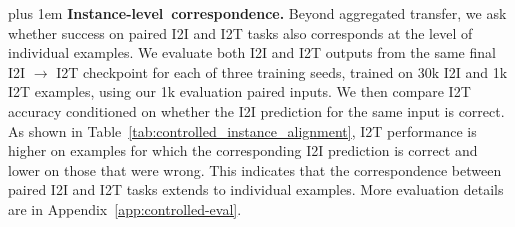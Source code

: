 \rightskip=0pt plus 1em
\noindent
\mbox{\textbf{Instance-level correspondence.}}\quad
Beyond aggregated transfer, we ask whether success on paired I2I and I2T tasks also corresponds at the level of individual examples.
We evaluate both I2I and I2T outputs from the same final I2I $\rightarrow$ I2T checkpoint for each of three training seeds, trained on 30k I2I and 1k I2T examples, using our 1k evaluation paired inputs.
We then compare I2T accuracy conditioned on whether the I2I prediction for the same input is correct.
As shown in Table~\ref{tab:controlled_instance_alignment}, I2T performance is higher on examples for which the corresponding I2I prediction is correct and lower on those that were wrong.
This indicates that the correspondence between paired I2I and I2T tasks extends to individual examples. More evaluation details are in Appendix~\ref{app:controlled-eval}.
\par
\endgroup
\par\endgroup
